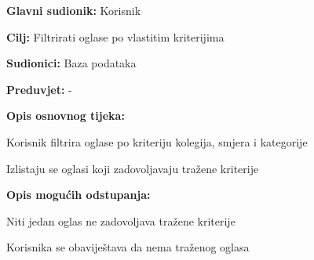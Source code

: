					\noindent {}
					\begin{packed_item}
	
						\item \textbf{Glavni sudionik: }Korisnik
						\item  \textbf{Cilj:} Filtrirati oglase po vlastitim kriterijima
						\item  \textbf{Sudionici:} Baza podataka
						\item  \textbf{Preduvjet:} -
						\item  \textbf{Opis osnovnog tijeka:}
						
						\item[] \begin{packed_enum}
	
							\item Korisnik filtrira oglase po kriteriju kolegija, smjera i kategorije
							\item Izlistaju se oglasi koji zadovoljavaju tražene kriterije
						\end{packed_enum}
						
						\item  \textbf{Opis mogućih odstupanja:}
						
						\item[] \begin{packed_item}
	
							\item[2.a] Niti jedan oglas ne zadovoljava tražene kriterije
							\item[] \begin{packed_enum}
								
								\item Korisnika se obaviještava da nema traženog oglasa
								
							\end{packed_enum}

							
						\end{packed_item}
					\end{packed_item}
					
